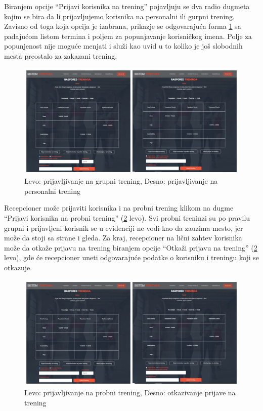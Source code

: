 \documentclass[../main.tex]{subfiles}
\begin{document}
Biranjem opcije ``Prijavi korisnika na trening'' pojavljuju se dva radio dugmeta kojim se bira da li prijavljujemo korisnika na personalni ili gurpni trening. Zavisno od toga koja opcija je izabrana, prikazje se odgovarajuća forma \ref{fig:recepcioner_prijava} sa  padajućom listom termina i poljem za popunjavanje korisničkog imena. Polje za popunjenost nije moguće menjati i služi kao uvid u to koliko je još slobodnih mesta preostalo za zakazani trening.

\begin{figure}[!ht]
\begin{center}
\includegraphics[scale=0.35]{sections/korisnicki_interfejs/screenshots/recepcioner_zakazi_trening.png}
\end{center}
\caption{ Levo: prijavljivanje na grupni trening, Desno: prijavljivanje na personalni trening }
\label{fig:recepcioner_prijava}
\end{figure}

Recepcioner može prijaviti korisnika i na probni trening klikom na dugme ``Prijavi korisnika na probni trening'' (\ref{fig:recepcioner_ostalo} levo). Svi probni treninzi su po pravilu grupni i prijavljeni korisnik se u evidenciji ne vodi kao da zauzima mesto, jer može da stoji sa strane i gleda. 
Za kraj, recepcioner na lični zahtev korisnika može da otkaže prijavu na trening biranjem opcije ``Otkaži prijavu na trening'' (\ref{fig:recepcioner_ostalo} levo), gde će recepcioner uneti odgovarajuće podatke o korisniku i treningu koji se otkazuje.

\begin{figure}[!ht]
\begin{center}
\includegraphics[scale=0.35]{sections/korisnicki_interfejs/screenshots/recepcioner_zakazi_trening.png}
\end{center}
\caption{ Levo: prijavljivanje na probni trening, Desno: otkazivanje prijave na trening }
\label{fig:recepcioner_ostalo}
\end{figure}
\end{document}
